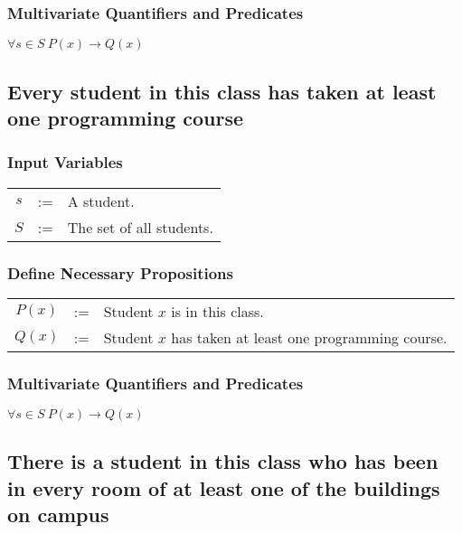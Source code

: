 \documentclass{article}
\begin{document}
\subsubsection{Multivariate Quantifiers and Predicates}
\begin{center}
  $ \forall s \in S~P(x) \rightarrow Q(x)$
\end{center}


\subsection{Every student in this class has taken at least one programming course}

\subsubsection{Input Variables}
\begin{center}
  \begin{tabular}{ccl}
    $s$ & := & A student. \\
    $S$ & := & The set of all students. \\
  \end{tabular}
\end{center}

\subsubsection{Define Necessary Propositions}
\begin{center}
  \begin{tabular}{ccl}
    $P(x)$ & := & Student $x$ is in this class. \\
    $Q(x)$ & := & Student $x$ has taken at least one programming course.
  \end{tabular}
\end{center}


\subsubsection{Multivariate Quantifiers and Predicates}
\begin{center}
  $ \forall s \in S~P(x) \rightarrow Q(x) $
\end{center}


\subsection{There is a student in this class who has been in every room of at least one of the buildings on campus}
\end{document}
